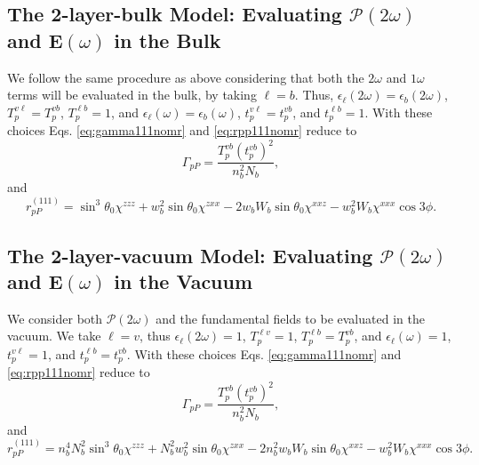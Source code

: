 
\subsection{The 2-layer-bulk Model: Evaluating
\texorpdfstring{$\boldsymbol{\mathcal{P}}(2\omega)$}{P(2w)} and
\texorpdfstring{$\mathbf{E}(\omega)$}{E(w)} in the Bulk}\label{sec:2-layer-bulk}

We follow the same procedure as above considering that both the $2\omega$ and
$1\omega$ terms will be evaluated in the bulk, by taking $\ell = b$. Thus,
$\epsilon_{\ell}(2\omega) = \epsilon_{b}(2\omega)$, $T^{v\ell}_{p} =
T^{vb}_{p}$, $T^{\ell b}_{p} = 1$, and $\epsilon_{\ell}(\omega) =
\epsilon_{b}(\omega)$, $t^{v\ell}_{p} = t^{vb}_{p}$, and $t^{\ell b}_{p} = 1$.
With these choices Eqs. \eqref{eq:gamma111nomr} and \eqref{eq:rpp111nomr} reduce
to
\begin{equation}
\Gamma_{pP} =
\frac{T_{p}^{vb}\left(t^{vb}_{p}\right)^{2}}{n^{2}_{b}N_{b}}, 
\end{equation}
and
\begin{equation}
r^{(111)}_{pP} = 
\sin^{3}\theta_{0}\chi^{zzz} + w^{2}_{b}\sin\theta_{0}\chi^{zxx} 
 - 2w_{b}W_{b}\sin\theta_{0}\chi^{xxz} - w^{2}_{b}W_{b}\chi^{xxx}\cos3\phi.
\end{equation}



\subsection{The 2-layer-vacuum Model: Evaluating
\texorpdfstring{$\boldsymbol{\mathcal{P}}(2\omega)$}{P(2w)} and
\texorpdfstring{$\mathbf{E}(\omega)$}{E(w)} in the Vacuum}
\label{sec:2-layer-vacuum}

We consider both $\boldsymbol{\mathcal{P}}(2\omega)$ and the fundamental fields
to be evaluated in the vacuum. We take $\ell = v$, thus
$\epsilon_{\ell}(2\omega) = 1$, $T^{\ell v}_{p} = 1$, $T^{\ell b}_{p} =
T^{vb}_{p}$, and $\epsilon_{\ell}(\omega) = 1$, $t^{v\ell}_{p} = 1$, and
$t^{\ell b}_{p} = t^{vb}_{p}$. With these choices Eqs. \eqref{eq:gamma111nomr}
and \eqref{eq:rpp111nomr} reduce to
\begin{equation}
\Gamma_{pP} =
\frac{T^{v b}_{p}\left(t^{v b}_{p}\right)^{2}}{n^{2}_{b}N_{b}},
\end{equation}
and
\begin{equation}
r^{(111)}_{pP} =
  n^{4}_{b}N^{2}_{b}\sin^{3}\theta_{0}\chi^{zzz}
+ N^{2}_{b}w^{2}_{b}\sin\theta_{0}\chi^{zxx}
- 2n^{2}_{b}w_{b}W_{b}\sin\theta_{0}\chi^{xxz}
- w^{2}_{b}W_{b}\chi^{xxx}\cos3\phi.
\end{equation}


